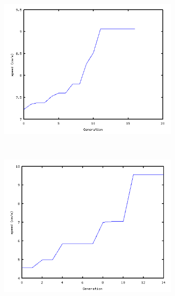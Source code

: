 \begin{figure}[h]
		\centering
        \begin{subfigure}[b]{0.31\textwidth}
                \centering
                \includegraphics[width=\textwidth]{images/results_7_fitness.png}
                \caption{\robotSeven}
                \label{fig:results_fitness_plot_7}
        \end{subfigure}
        ~
        \begin{subfigure}[b]{0.31\textwidth}
                \centering
                \includegraphics[width=\textwidth]{images/results_9_fitness.png}
                \caption{\robotNine}

\end{subfigure}
\end{figure}
